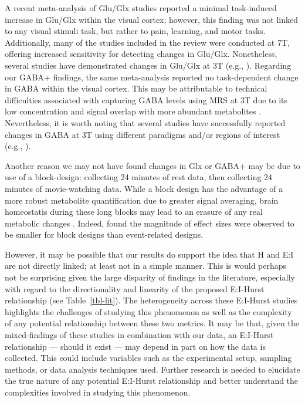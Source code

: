 \documentclass[
true
]{sn-jnl}
\begin{document}
A recent meta-analysis of Glu/Glx studies
\citep{pasantaFunctionalMRSStudies2023} reported a minimal task-induced
increase in Glu/Glx within the visual cortex; however, this finding was
not linked to any visual stimuli task, but rather to pain, learning, and
motor tasks. Additionally, many of the studies included in the review
were conducted at 7T, offering increased sensitivity for detecting
changes in Glu/Glx. Nonetheless, several studies have demonstrated
changes in Glu/Glx at 3T (e.g.,
\citep{gutzeitDifferentialNMRSpectroscopy2013, cleveAssessmentIntraInterregional2017, apsvalkaEventrelatedDynamicsGlutamate2015}).
Regarding our GABA+ findings, the same meta-analysis
\citep{pasantaFunctionalMRSStudies2023} reported no task-dependent
change in GABA within the visual cortex. This may be attributable to
technical difficulties associated with capturing GABA levels using MRS
at 3T due to its low concentration and signal overlap with more abundant
metabolites \citep{pasantaFunctionalMRSStudies2023}. Nevertheless, it is
worth noting that several studies have successfully reported changes in
GABA at 3T using different paradigms and/or regions of interest (e.g.,
\citep{floyer-leaRapidModulationGABA2006, sampaio-baptistaChangesFunctionalConnectivity2015, staggRoleGABAHuman2011}).

Another reason we may not have found changes in Glx or GABA+ may be due
to use of a block-design: collecting 24 minutes of rest data, then
collecting 24 minutes of movie-watching data. While a block design has
the advantage of a more robust metabolite quantification due to greater
signal averaging, brain homeostatis during these long blocks may lead to
an erasure of any real metabolic changes
\citep{mangiaMetabolicPathwaysActivitydependent2012, apsvalkaEventrelatedDynamicsGlutamate2015}.
Indeed, \citet{pasantaFunctionalMRSStudies2023} found the magnitude of
effect sizes were observed to be smaller for block designs than
event-related designs.

However, it may be possible that our results do support the idea that H
and E:I are not directly linked; at least not in a simple manner. This
is would perhaps not be surprising given the large disparity of findings
in the literature, especially with regard to the directionality and
linearity of the proposed E:I-Hurst relationship
\citep{liangExcitationInhibitionBalance2024, poilCriticalStateDynamicsAvalanches2012, lombardiBalanceExcitationInhibition2017, baumgartenCriticalExcitationinhibitionBalance2019, bruiningMeasurementExcitationinhibitionRatio2020, trakoshisIntrinsicExcitationinhibitionImbalance, gaoInferringSynapticExcitation2017}
(see Table~\ref{tbl-lit}). The heterogeneity across these E:I-Hurst
studies highlights the challenges of studying this phenomenon as well as
the complexity of any potential relationship between these two metrics.
It may be that, given the mixed-findings of these studies in combination
with our data, an E:I-Hurst relationship --- should it exist --- may
depend in part on how the data is collected. This could include
variables such as the experimental setup, sampling methods, or data
analysis techniques used. Further research is needed to elucidate the
true nature of any potential E:I-Hurst relationship and better
understand the complexities involved in studying this phenomenon.
\end{document}
